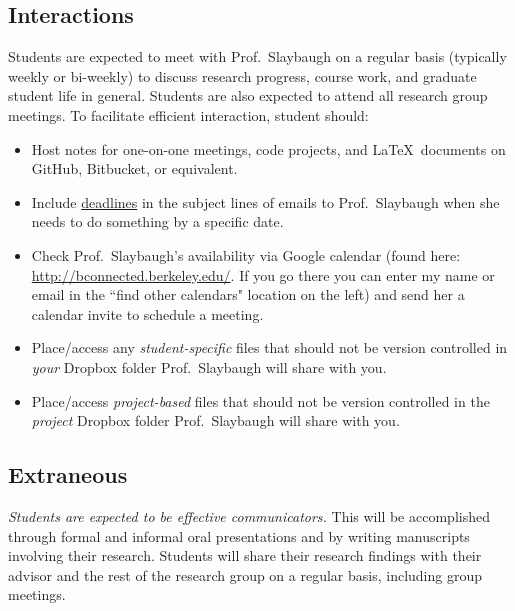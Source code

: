 \documentclass[12pt,twoside]{article}
\begin{document}
\subsection*{Interactions}

Students are expected to meet with Prof.\ Slaybaugh on a regular basis (typically weekly or bi-weekly) to discuss research progress, course work, and graduate student life in general. Students are also expected to attend all research group meetings. To facilitate efficient interaction, student should: 
%
\begin{itemize}
\item Host notes for one-on-one meetings, code projects, and \LaTeX \ documents on GitHub, Bitbucket, or equivalent.
\item Include \underline{deadlines} in the subject lines of emails to Prof.\ Slaybaugh when she needs to do something by a specific date.
\item Check Prof.\ Slaybaugh's availability via Google calendar (found here:\\ \href{http://bconnected.berkeley.edu/}{http://bconnected.berkeley.edu/}. If you go there you can enter my name or email in the ``find other calendars" location on the left) and send her a calendar invite to schedule a meeting.
\item Place/access any \textit{student-specific} files that should not be version controlled in \textit{your} Dropbox folder Prof.\ Slaybaugh will share with you. 
\item Place/access \textit{project-based} files that should not be version controlled in the \textit{project} Dropbox folder Prof.\ Slaybaugh will share with you.
\end{itemize}

\subsection*{Extraneous}

\textit{Students are expected to be effective communicators.} This will be accomplished through formal and informal oral presentations and by writing manuscripts involving their research. Students will share their research findings with their advisor and the rest of the research group on a regular basis, including group meetings.  
\end{document}
